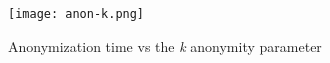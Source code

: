 \begin{figure}[ht]
    \centering
    \texttt{[image: anon-k.png]}
    \caption{Anonymization  time vs the \emph{k} anonymity parameter}\label{fig:anon_k}
\end{figure}